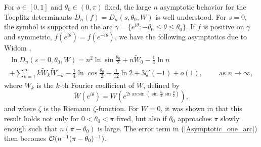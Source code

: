 \documentclass[11pt,fleqn]{article}
\numberwithin{equation}{section}
\def\bigO{{\cal O}}
\begin{document}
For $s\in [0,1]$ and $\theta_0\in(0,\pi)$ fixed, the large $n$ asymptotic behavior for the Toeplitz determinants $D_n(f)=D_n(s,\theta_0,W)$ is well understood.
For $s=0$, the symbol is supported on the arc $\gamma= \{e^{i\theta}:-\theta_0\leq \theta\leq \theta_0\}$. If $f$ is positive on $\gamma$ and symmetric, $f(e^{i\theta}) = f(e^{-i\theta})$, we have the following asymptotics due to Widom \cite{Widom},
\begin{multline} \label{Asymptotic_one_arc}
\ln D_n \left(s=0, \theta_{0},W \right) = n^2\ln \sin  \frac{\theta_0}{2}  + n\widetilde{W}_0 - \frac{1}{4} \ln n  \\
+\sum_{k=1}^{\infty}k\widetilde{W}_k\widetilde{W}_{-k}-\frac{1}{4}\ln\cos\frac{\theta_0}{2}+\frac{1}{12}\ln 2 +3\zeta'(-1)+ o(1), \qquad\mbox{ as $n\to\infty$},
\end{multline}
where $\widetilde{W}_k$ is the $k$-th Fourier coefficient of $\widetilde{W}$, defined by
\begin{equation}
\widetilde{W}(e^{i\theta}) = W(e^{2i\arcsin ( \sin \frac{\theta_{0}}{2}\sin \frac{\theta}{2} )}),
\end{equation}
and where $\zeta$ is the Riemann $\zeta$-function.
For $W=0$, it was shown in \cite{Krasovsky, Krasovsky2} that this result holds not only for $0<\theta_0<\pi$ fixed, but also if $\theta_0$ approaches $\pi$ slowly enough such that $n(\pi-\theta_0)$ is large. The error term in (\ref{Asymptotic_one_arc}) then becomes $\bigO(n^{-1}(\pi-\theta_0)^{-1})$. 
\end{document}
